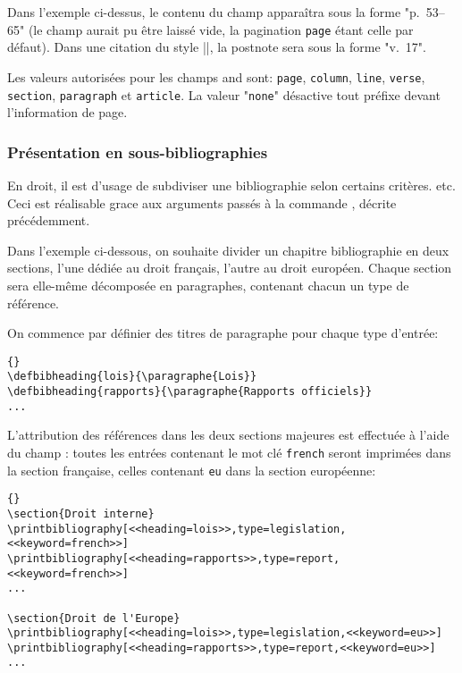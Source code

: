 \documentclass{ltxdockit}
\begin{document}
Dans l'exemple ci-dessus, le contenu du champ  apparaîtra sous la forme "p.~53--65" (le champ  aurait pu être laissé vide, la pagination \texttt{page} étant celle par défaut). Dans une citation du style |\cite[17]{key}|, la postnote sera sous la forme "v.~17".

Les valeurs autorisées pour les champs  and  sont: \texttt{page}, \texttt{column}, \texttt{line}, \texttt{verse}, \texttt{section}, \texttt{paragraph} et \texttt{article}. La valeur "\texttt{none}" désactive tout préfixe devant l'information de page.

\subsubsection{Présentation en sous-bibliographies}

En droit, il est d'usage de subdiviser une bibliographie selon certains critères. etc. Ceci est réalisable grace aux arguments passés à la commande , décrite précédemment.

Dans l'exemple ci-dessous, on souhaite divider un chapitre bibliographie en deux sections, l'une dédiée au droit français, l'autre au droit européen. Chaque section sera elle-même décomposée en paragraphes, contenant chacun un type de référence.

On commence par définier des titres de paragraphe pour chaque type d'entrée:

\begin{lstlisting}[style=latex]{}
\defbibheading{lois}{\paragraphe{Lois}}
\defbibheading{rapports}{\paragraphe{Rapports officiels}}
...
\end{lstlisting}
%

L'attribution des références dans les deux sections majeures est effectuée à l'aide du champ : toutes les entrées contenant le mot clé \texttt{french} seront imprimées dans la section française, celles contenant \texttt{eu} dans la section européenne:

\begin{lstlisting}[style=latex]{}
\section{Droit interne}
\printbibliography[<<heading=lois>>,type=legislation,<<keyword=french>>]
\printbibliography[<<heading=rapports>>,type=report,<<keyword=french>>]
...

\section{Droit de l'Europe}
\printbibliography[<<heading=lois>>,type=legislation,<<keyword=eu>>]
\printbibliography[<<heading=rapports>>,type=report,<<keyword=eu>>]
...
\end{lstlisting}
%
\end{document}
